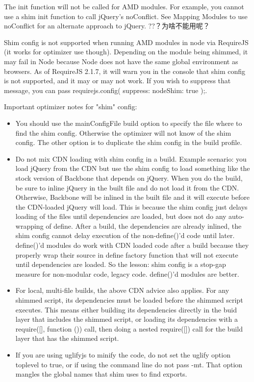 \item The init function will not be called for AMD modules. For example, you cannot use a shim init function to call jQuery's noConflict. See Mapping Modules to use noConflict for an alternate approach to jQuery.   ??？为啥不能用呢？

\item Shim config is not supported when running AMD modules in node via RequireJS (it works for optimizer use though). Depending on the module being shimmed, it may fail in Node because Node does not have the same global environment as browsers. As of RequireJS 2.1.7, it will warn you in the console that shim config is not supported, and it may or may not work. If you wish to suppress that message, you can pass requirejs.config({ suppress: { nodeShim: true }});.



Important optimizer notes for "shim" config:
\begin{itemize}
\item You should use the mainConfigFile build option to specify the file where to find the shim config. Otherwise the optimizer will not know of the shim config. The other option is to duplicate the shim config in the build profile.
\item Do not mix CDN loading with shim config in a build. Example scenario: you load jQuery from the CDN but use the shim config to load something like the stock version of Backbone that depends on jQuery. When you do the build, be sure to inline jQuery in the built file and do not load it from the CDN. Otherwise, Backbone will be inlined in the built file and it will execute before the CDN-loaded jQuery will load. This is because the shim config just delays loading of the files until dependencies are loaded, but does not do any auto-wrapping of define. After a build, the dependencies are already inlined, the shim config cannot delay execution of the non-define()'d code until later. define()'d modules do work with CDN loaded code after a build because they properly wrap their source in define factory function that will not execute until dependencies are loaded. So the lesson: shim config is a stop-gap measure for non-modular code, legacy code. define()'d modules are better.
\item For local, multi-file builds, the above CDN advice also applies. For any shimmed script, its dependencies must be loaded before the shimmed script executes. This means either building its dependencies directly in the buid layer that includes the shimmed script, or loading its dependencies with a require([], function (){}) call, then doing a nested require([]) call for the build layer that has the shimmed script.
\item If you are using uglifyjs to minify the code, do not set the uglify option toplevel to true, or if using the command line do not pass -mt. That option mangles the global names that shim uses to find exports.
\end{itemize}





